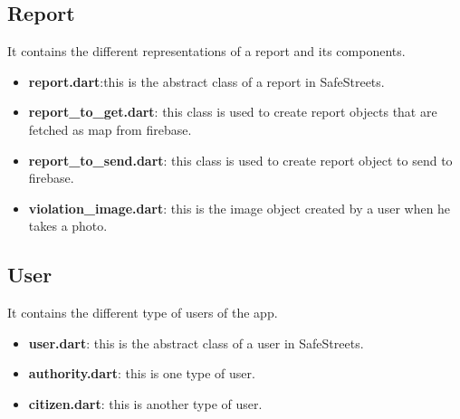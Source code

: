 \documentclass[../ITD.tex]{subfiles}
\begin{document}
    \subsection{Report}\label{subsec:report}
    It contains the different representations of a report and its components.
    \begin{itemize}
        \item \textbf{report.dart}:this is the abstract class of a report in SafeStreets.
        \item \textbf{report\_to\_get.dart}: this class is used to create report objects that are fetched as map from firebase.
        \item \textbf{report\_to\_send.dart}: this class is used to create report object to send to firebase.
        \item \textbf{violation\_image.dart}: this is the image object created by a user when he takes a photo.
    \end{itemize}
    \subsection{User}\label{subsec:user}
    It contains the different type of users of the app.
    \begin{itemize}
        \item \textbf{user.dart}: this is the abstract class of a user in SafeStreets.
        \item \textbf{authority.dart}: this is one type of user.
        \item \textbf{citizen.dart}: this is another type of user.
    \end{itemize}
\end{document}
